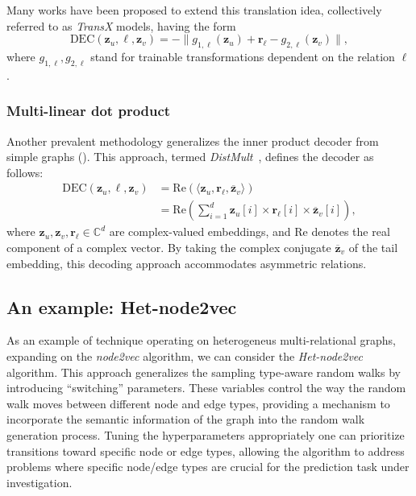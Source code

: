 Many works have been proposed to extend this translation idea, collectively referred to as \textit{TransX} models, having the form
\begin{equation*}
    \text{DEC}(\mathbf{z}_u, \ell, \mathbf{z}_v) = -\|g_{1,\ell}(\mathbf{z}_u) + \mathbf{r}_\ell - g_{2,\ell}(\mathbf{z}_v)\|,
\end{equation*}
where $ g_{1,\ell}, g_{2,\ell} $ stand for trainable transformations dependent on the relation $ \ell $.

\subsubsection{Multi-linear dot product}
Another prevalent methodology generalizes the inner product decoder from simple graphs (). This approach, termed \textit{DistMult}~\cite{Yang2014DistMult}, defines the decoder as follows:
\begin{align*}
\text{DEC}(\mathbf{z}_u, \ell, \mathbf{z}_v) &= \text{Re}(\langle \mathbf{z}_u, \mathbf{r}_\ell, \overline{\mathbf{z}}_v\rangle)\\
&= \text{Re}(\sum_{i=1}^d \mathbf{z}_u[i] \times \mathbf{r}_\ell[i] \times \overline{\mathbf{z}}_v[i]),
\end{align*}
where $ \mathbf{z}_u, \mathbf{z}_v, \mathbf{r}_\ell \in \mathbb{C}^d $ are complex-valued embeddings, and $ \text{Re} $ denotes the real component of a complex vector. By taking the complex conjugate $ \overline{\mathbf{z}}_v $ of the tail embedding, this decoding approach accommodates asymmetric relations.

\subsection{An example: Het-node2vec}
As an example of technique operating on heterogeneus multi-relational graphs, expanding on the \textit{node2vec} algorithm, we can consider the \textit{Het-node2vec}~\cite{soto2021hetnode2vec} algorithm. This approach generalizes the sampling type-aware random walks  by introducing ``switching'' parameters. These variables control the way the random walk moves between
different node and edge types, providing a mechanism to incorporate the semantic information of the graph into the random walk generation process. Tuning the hyperparameters appropriately one can prioritize transitions toward specific node or edge types, allowing the algorithm to address problems where specific node/edge types are crucial for the prediction task under investigation.


